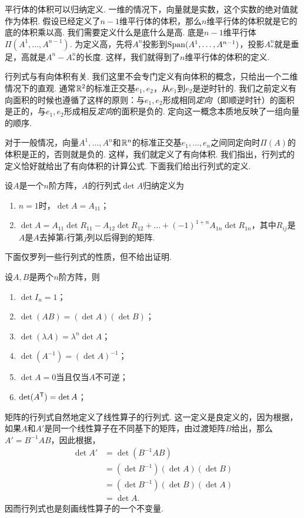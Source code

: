 平行体的体积可以归纳定义. 一维的情况下，向量就是实数，这个实数的绝对值就作为体积. 假设已经定义了$n-1$维平行体的体积，那么$n$维平行体的体积就是它的底的体积乘以高. 我们需要定义什么是底什么是高. 底是$n-1$维平行体$\Pi(A^1,\dots,A^{n-1})$. 为定义高，先将$A^n$投影到$\operatorname*{Span}(A^1,\dots,A^{n-1})$，投影$A^n_*$就是垂足，高就是$A^n-A^n_*$的长度. 这样，我们就得到了$n$维平行体的体积的定义. 

行列式与有向体积有关. 我们这里不会专门定义有向体积的概念，只给出一个二维情况下的直观. 通常$\mathbb{R}^2$的标准正交基$e_1,e_2$，从$e_1$到$e_2$是逆时针的. 我们之前定义有向面积的时候也遵循了这样的原则：与$e_1,e_2$形成相同\textit{定向}（即顺逆时针）的面积是正的，与$e_1,e_2$形成相反\textit{定向}的面积是负的. 定向这一概念本质地反映了一组向量的顺序. 

对于一般情况，向量$A^1,\dots,A^n$和$\mathbb{R}^n$的标准正交基$e_1,\dots,e_n$之间同定向时$\Pi(A)$的体积是正的，否则就是负的. 这样，我们就定义了有向体积. 我们指出，行列式的定义恰好就给出了有向体积的计算公式. 下面我们给出行列式的定义. 

\begin{definition}[行列式]
    设$A$是一个$n$阶方阵，$A$的行列式$\det A$归纳定义为
\begin{enumerate}
    \item $n=1$时，$\det A=A_{11}$；
    \item $\det A=A_{11}\det R_{11}-A_{12}\det R_{12}+\dots+(-1)^{1+n}A_{1n}\det R_{1n}$，其中$R_{ij}$是$A$是$A$去掉第$i$行第$j$列以后得到的矩阵. 
\end{enumerate}
\end{definition}

下面仅罗列一些行列式的性质，但不给出证明. 

\begin{proposition}\label{proposition:determinant}
    设$A,B$是两个$n$阶方阵，则
    \begin{enumerate}
        \item $\det I_n=1$；
        \item $\det(AB)=(\det A)(\det B)$；
        \item $\det(\lambda A)=\lambda^n\det A$；
        \item $\det(A^{-1})=(\det A)^{-1}$；
        \item $\det A=0$当且仅当$A$不可逆；
        \item $\det(A^{\mathsf{T}})=\det A$；
    \end{enumerate}
\end{proposition}

矩阵的行列式自然地定义了线性算子的行列式. 这一定义是良定义的，因为根据，如果$A$和$A'$是同一个线性算子在不同基下的矩阵，由过渡矩阵$B$给出，那么$A'=B^{-1}AB$，因此根据，
\begin{align*}
    \det A'&=\det(B^{-1}AB)\\
    &=(\det B^{-1})(\det A)(\det B)\\
    &=(\det B^{-1})(\det B)(\det A)\\
    &=\det A.
\end{align*}
因而行列式也是刻画线性算子的一个不变量. 

